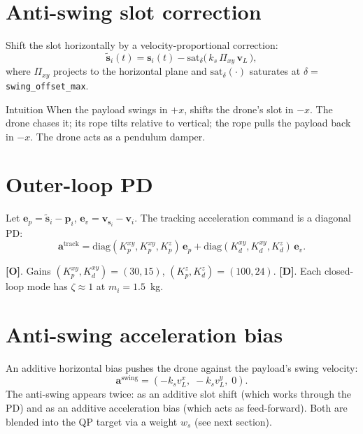 \documentclass[11pt,a4paper,oneside]{report}
\newcommand{\bp}{\bm{p}}
\newcommand{\bv}{\bm{v}}
\newcommand{\ba}{\bm{a}}
\newcommand{\bs}{\bm{s}}
\newcommand{\be}{\bm{e}}
\newcommand{\diag}{\mathrm{diag}}
\newcommand{\sat}{\mathrm{sat}}
\newcommand{\Obs}{\textcolor{green!50!black}{\textbf{[O]}}}
\newcommand{\Der}{\textcolor{blue!60!black}{\textbf{[D]}}}
\begin{document}
\section{Anti-swing slot correction}

Shift the slot horizontally by a velocity-proportional correction:
\begin{equation}
\tilde{\bs}_i(t)
= \bs_i(t) - \sat_{\delta}\!\Big(\, k_s\,\Pi_{xy}\,\bv_L \,\Big),
\label{eq:antiswing-slot}
\end{equation}
where $\Pi_{xy}$ projects to the horizontal plane and
$\sat_{\delta}(\cdot)$ saturates at $\delta=$\texttt{swing\_offset\_max}.

\begin{insight}{Intuition}
When the payload swings in $+x$,  shifts the
drone's slot in $-x$. The drone chases it; its rope tilts relative to
vertical; the rope pulls the payload back in $-x$. The drone acts as
a pendulum damper.
\end{insight}

\section{Outer-loop PD}

Let $\be_p = \tilde{\bs}_i - \bp_i$, $\be_v = \bv_{\bs_i} - \bv_i$.
The tracking acceleration command is a diagonal PD:
\begin{equation}
\ba^\text{track} =
\diag(K_p^{xy},K_p^{xy},K_p^{z})\,\be_p +
\diag(K_d^{xy},K_d^{xy},K_d^{z})\,\be_v.
\label{eq:atrack}
\end{equation}

\Obs. Gains $(K_p^{xy},K_d^{xy})=(30,15)$, $(K_p^{z},K_d^{z})=(100,24)$.
\Der. Each closed-loop mode has $\zeta\approx 1$ at $m_i=1.5$~kg.

\section{Anti-swing acceleration bias}

An additive horizontal bias pushes the drone against the payload's
swing velocity:
\begin{equation}
\ba^\text{swing} = (-k_s v_L^x,\; -k_s v_L^y,\; 0).
\label{eq:aswing}
\end{equation}
The anti-swing appears twice: as an additive slot shift
 (which works through the PD) and as an
additive acceleration bias (which acts as feed-forward). Both are
blended into the QP target via a weight $w_s$ (see next section).
\end{document}
